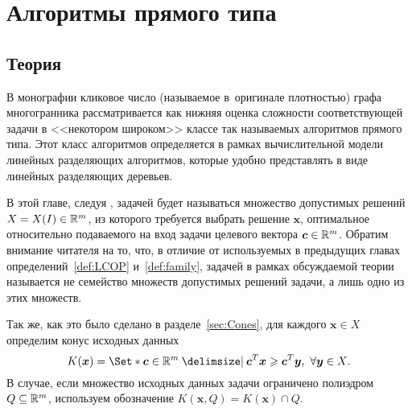 
%
%

\chapter{Алгоритмы прямого типа}
\label{chap:Direct}


\section{Теория}
\label{sec:DirectTheory}

В монографии \cite{BondBook:1995} кликовое число (называемое в~оригинале плотностью) графа многогранника рассматривается как нижняя оценка сложности соответствующей задачи
в <<некотором широком>> классе так называемых алгоритмов прямого типа. 
Этот класс алгоритмов определяется в рамках вычислительной модели линейных разделяющих алгоритмов, которые удобно представлять в виде линейных разделяющих деревьев.

В этой главе, следуя \cite{BondBook:1995}, задачей будет называться множество допустимых решений $X = X(I) \in \mathbb{R}^m$, из которого требуется выбрать решение $\bm{x}$, оптимальное относительно подаваемого на вход задачи целевого вектора $\bm{c} \in \mathbb{R}^m$.
Обратим внимание читателя на то, что, в отличие от используемых в предыдущих главах определений~\ref{def:LCOP} и~\ref{def:family}, задачей в рамках обсуждаемой теории называется не семейство множеств допустимых решений задачи, а лишь одно из этих множеств.

Так же, как это было сделано в разделе~\ref{sec:Cones}, для каждого $\bm{x} \in X$ определим конус исходных данных
\begin{equation}
\label{eq:cone}
K(\bm{x}) = \Set*{\bm{c}\in \R^m \given  \bm{c}^T \bm{x} \ge \bm{c}^T \bm{y}, \ \forall \bm{y} \in X}.
\end{equation}
В случае, если множество исходных данных задачи ограничено полиэдром $Q \subseteq \mathbb{R}^m$, используем обозначение $K(\bm{x}, Q) = K(\bm{x}) \cap Q$.

